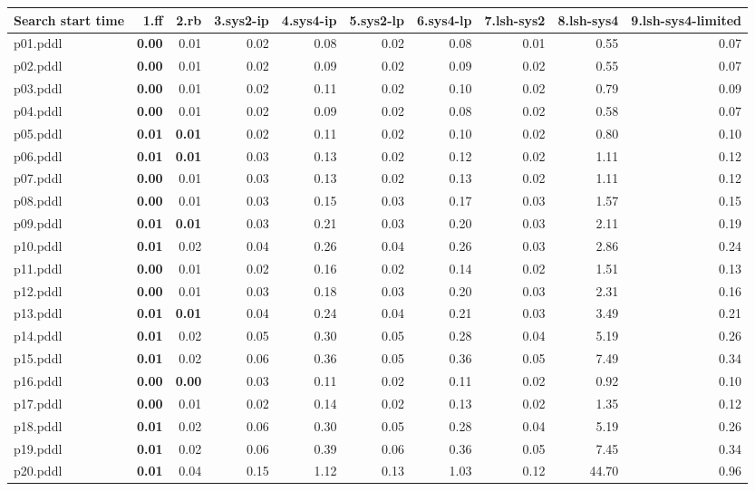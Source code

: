 \documentclass{article}
\begin{document}
\begin{tabular}{@{}lrrrrrrrrr@{}}
Search start time & 1.ff & 2.rb & 3.sys2-ip & 4.sys4-ip & 5.sys2-lp & 6.sys4-lp & 7.lsh-sys2 & 8.lsh-sys4 & 9.lsh-sys4-limited \\
\midrule
p01.pddl & \textbf{0.00} & 0.01 & 0.02 & 0.08 & 0.02 & 0.08 & 0.01 & 0.55 & 0.07 \\
p02.pddl & \textbf{0.00} & 0.01 & 0.02 & 0.09 & 0.02 & 0.09 & 0.02 & 0.55 & 0.07 \\
p03.pddl & \textbf{0.00} & 0.01 & 0.02 & 0.11 & 0.02 & 0.10 & 0.02 & 0.79 & 0.09 \\
p04.pddl & \textbf{0.00} & 0.01 & 0.02 & 0.09 & 0.02 & 0.08 & 0.02 & 0.58 & 0.07 \\
p05.pddl & \textbf{0.01} & \textbf{0.01} & 0.02 & 0.11 & 0.02 & 0.10 & 0.02 & 0.80 & 0.10 \\
p06.pddl & \textbf{0.01} & \textbf{0.01} & 0.03 & 0.13 & 0.02 & 0.12 & 0.02 & 1.11 & 0.12 \\
p07.pddl & \textbf{0.00} & 0.01 & 0.03 & 0.13 & 0.02 & 0.13 & 0.02 & 1.11 & 0.12 \\
p08.pddl & \textbf{0.00} & 0.01 & 0.03 & 0.15 & 0.03 & 0.17 & 0.03 & 1.57 & 0.15 \\
p09.pddl & \textbf{0.01} & \textbf{0.01} & 0.03 & 0.21 & 0.03 & 0.20 & 0.03 & 2.11 & 0.19 \\
p10.pddl & \textbf{0.01} & 0.02 & 0.04 & 0.26 & 0.04 & 0.26 & 0.03 & 2.86 & 0.24 \\
p11.pddl & \textbf{0.00} & 0.01 & 0.02 & 0.16 & 0.02 & 0.14 & 0.02 & 1.51 & 0.13 \\
p12.pddl & \textbf{0.00} & 0.01 & 0.03 & 0.18 & 0.03 & 0.20 & 0.03 & 2.31 & 0.16 \\
p13.pddl & \textbf{0.01} & \textbf{0.01} & 0.04 & 0.24 & 0.04 & 0.21 & 0.03 & 3.49 & 0.21 \\
p14.pddl & \textbf{0.01} & 0.02 & 0.05 & 0.30 & 0.05 & 0.28 & 0.04 & 5.19 & 0.26 \\
p15.pddl & \textbf{0.01} & 0.02 & 0.06 & 0.36 & 0.05 & 0.36 & 0.05 & 7.49 & 0.34 \\
p16.pddl & \textbf{0.00} & \textbf{0.00} & 0.03 & 0.11 & 0.02 & 0.11 & 0.02 & 0.92 & 0.10 \\
p17.pddl & \textbf{0.00} & 0.01 & 0.02 & 0.14 & 0.02 & 0.13 & 0.02 & 1.35 & 0.12 \\
p18.pddl & \textbf{0.01} & 0.02 & 0.06 & 0.30 & 0.05 & 0.28 & 0.04 & 5.19 & 0.26 \\
p19.pddl & \textbf{0.01} & 0.02 & 0.06 & 0.39 & 0.06 & 0.36 & 0.05 & 7.45 & 0.34 \\
p20.pddl & \textbf{0.01} & 0.04 & 0.15 & 1.12 & 0.13 & 1.03 & 0.12 & 44.70 & 0.96 \\
\end{tabular}
\end{document}
